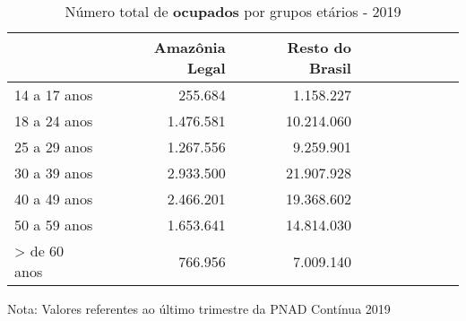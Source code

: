 \begin{table}[H]
\centering
\label{\_retrato\_emprego\_fotografia\_faixa\_etaria\_table\_ocupados}
\begin{threeparttable}
\caption{Número total de \textbf{ocupados} por grupos etários - 2019}
\begin{tabular}{l*{3}{rrr}}
\midrule \midrule
                    &Amazônia Legal&Resto do Brasil\\
\midrule
14 a 17 anos        &     255.684&   1.158.227\\
18 a 24 anos        &   1.476.581&  10.214.060\\
25 a 29 anos        &   1.267.556&   9.259.901\\
30 a 39 anos        &   2.933.500&  21.907.928\\
40 a 49 anos        &   2.466.201&  19.368.602\\
50 a 59 anos        &   1.653.641&  14.814.030\\
> de 60 anos        &     766.956&   7.009.140\\
\bottomrule
\end{tabular}
\begin{tablenotes}
\scriptsize{Nota: Valores referentes ao último trimestre da PNAD Contínua 2019}
\end{tablenotes}
\end{threeparttable}
\end{table}
